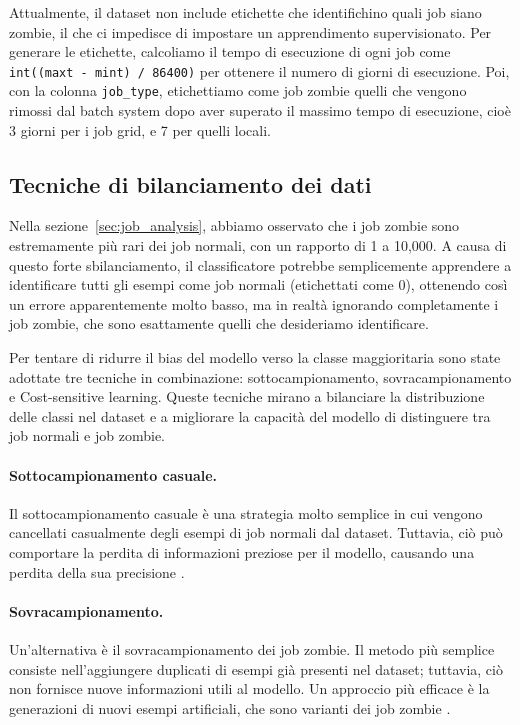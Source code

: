 Attualmente, il dataset non include etichette che identifichino quali job
siano zombie, il che ci impedisce di impostare un apprendimento
supervisionato. Per generare le etichette, calcoliamo il tempo di esecuzione
di ogni job come \verb|int((maxt - mint) / 86400)| per ottenere il numero di
giorni di esecuzione. Poi, con la colonna \texttt{job\_type}, etichettiamo
come job zombie quelli che vengono rimossi dal batch system dopo aver superato
il massimo tempo di esecuzione, cioè 3 giorni per i job grid, e 7 per quelli
locali.

\subsection{Tecniche di bilanciamento dei dati}
\label{sec:imbalanced_data}

Nella sezione~\ref{sec:job_analysis}, abbiamo osservato che i job zombie sono
estremamente più rari dei job normali, con un rapporto di 1 a 10,000. A causa
di questo forte sbilanciamento, il classificatore potrebbe semplicemente
apprendere a identificare tutti gli esempi come job normali (etichettati come
0), ottenendo così un errore apparentemente molto basso, ma in realtà
ignorando completamente i job zombie, che sono esattamente quelli che
desideriamo identificare. 

Per tentare di ridurre il bias del modello verso la classe maggioritaria sono
state adottate tre tecniche in combinazione: sottocampionamento,
sovracampionamento e Cost-sensitive learning. Queste tecniche mirano a
bilanciare la distribuzione delle classi nel dataset e a migliorare la
capacità del modello di distinguere tra job normali e job zombie. 

\paragraph{Sottocampionamento casuale.} Il sottocampionamento casuale è una
strategia molto semplice in cui vengono cancellati casualmente degli esempi di
job normali dal dataset. Tuttavia, ciò può comportare la perdita di
informazioni preziose per il modello, causando una perdita della sua
precisione \cite{he2013}.

\paragraph{Sovracampionamento.}
\label{par:vae}

Un'alternativa è il sovracampionamento dei job zombie. Il metodo più semplice
consiste nell'aggiungere duplicati di esempi già presenti nel dataset;
tuttavia, ciò non fornisce nuove informazioni utili al modello. Un approccio
più efficace è la generazioni di nuovi esempi artificiali, che sono varianti
dei job zombie \cite{brownlee2021}. 

